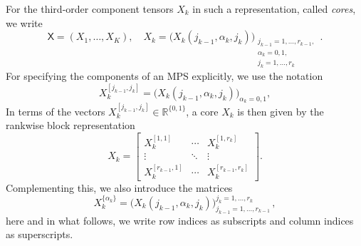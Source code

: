 \documentclass[a4paper,11pt,oneside]{amsart}
\theoremstyle{definition}
\theoremstyle{remark}
\newcommand{\R}{\mathbb{R}}
\newcommand{\rep}[1]{\mathsf{#1}}
\numberwithin{equation}{section}
\numberwithin{theorem}{section}
\begin{document}
For the third-order component tensors $X_k$ in such a representation, called \emph{cores}, we write
\begin{equation}\label{eq:cores}
 \rep{X} = (X_1,\ldots, X_K),\quad    X_k = \bigl(  X_k(j_{k-1}, \alpha_k, j_k)  \bigr)_{\substack{j_{k-1}  = 1,\ldots, r_{k-1}, \\ \alpha_k = 0,1,  \\ j_k = 1,\ldots,r_k}} \,.
\end{equation}
%
%
%
%
%
%
%
%
%
%
%
For specifying the components of an MPS explicitly, we use the notation
\begin{equation*}\label{eq:corenotation1}
   X^{ [j_{k-1}, j_k] }_k = \bigl( X_k(j_{k-1}, \alpha_k, j_k) \bigr)_{\alpha_k=0,1},    
%
\end{equation*}
%
In terms of the vectors $X_k^{[j_{k-1}, j_k]} \in \R^{\{0,1\}}$, a core $X_k$ is then given by the rankwise block representation
\begin{equation}\label{eq:corenotation2}
   X_k = \begin{bmatrix} X_k^{[1,1]} & \cdots &  X_k^{[1,r_k]}  \\ \vdots & \ddots & \vdots \\ X_k^{[r_{k-1},1]} & \cdots & X_k^{[r_{k-1},r_k]}  \end{bmatrix}.
\end{equation}
%
%
%
%
%
%
%
%
%
Complementing this, we also introduce the matrices
\begin{equation*}
   X^{ \{ \alpha_k \} }_k  = \bigl( X_k(j_{k-1}, \alpha_k, j_k) \bigr)_{j_{k-1}=1,\ldots,r_{k-1}}^{j_k=1,\ldots,r_k} \, ,
\end{equation*}
here and in what follows, we write row indices as subscripts and column indices as superscripts.
%
\end{document}
